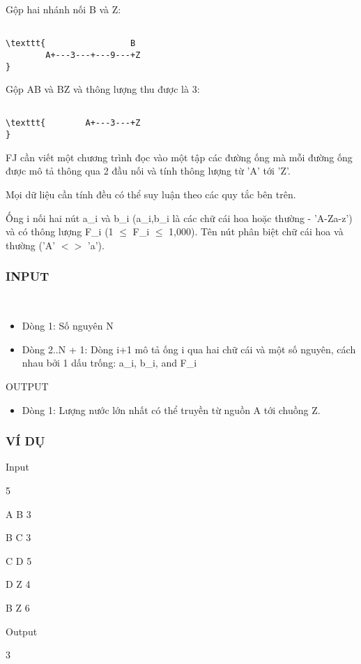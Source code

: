 Gộp hai nhánh nối B và Z:
\begin{verbatim}

\texttt{                 B
        A+---3---+---9---+Z
}\end{verbatim}

Gộp AB và BZ và thông lượng thu được là 3:
\begin{verbatim}

\texttt{        A+---3---+Z
}\end{verbatim}

FJ cần viết một chương trình đọc vào một tập các đường ống mà mỗi đường ống được mô tả thông qua 2 đầu nối và tính thông lượng từ 'A' tới 'Z'.

Mọi dữ liệu cần tính đều có thể suy luận theo các quy tắc bên trên.

Ống i nối hai nút a\_i và b\_i (a\_i,b\_i là các chữ cái hoa hoặc thường - 'A-Za-z') và có thông lượng F\_i (1  $\le$  F\_i  $\le$  1,000). Tên nút phân biệt chữ cái hoa và thường ('A' $<$$>$ 'a').

\subsubsection{INPUT}

 
\begin{itemize}
	\item Dòng 1: Số nguyên N
	\item Dòng 2..N + 1: Dòng i+1 mô tả ống i qua hai chữ cái và một số nguyên, cách nhau bởi 1 dấu trống: a\_i, b\_i, and F\_i
\end{itemize}

OUTPUT
\begin{itemize}
	\item Dòng 1: Lượng nước lớn nhất có thể truyền từ nguồn A tới chuồng Z.
\end{itemize}

\subsubsection{VÍ DỤ}

Input

5


A B 3


B C 3


C D 5


D Z 4


B Z 6





Output

3
